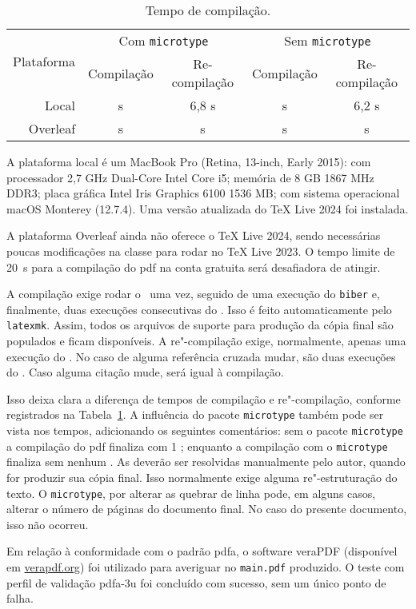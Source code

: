 \begin{table}
	\caption{Tempo de compilação.}
	\label{tab:time}
	\begin{tabular}{r c c c c}\toprule
		\multirow{2}{*}{Plataforma}	&	\multicolumn{2}{c}{Com \texttt{microtype}}	&	\multicolumn{2}{c}{Sem \texttt{microtype}}\\
								&	Compilação	& Re-compilação	& Compilação	& Re-compilação\\\midrule
		Local	&	s	&	6,8 s	&	s	&	6,2 s\\
		Overleaf	&	s	&	s	&	s	&	s\\\bottomrule
	\end{tabular}
\end{table}

A plataforma local é um MacBook Pro (Retina, 13-inch, Early 2015): com processador 2,7 GHz Dual-Core Intel Core i5; memória de 8 GB 1867 MHz DDR3; placa gráfica Intel Iris Graphics 6100 1536 MB; com sistema operacional macOS Monterey (12.7.4). Uma versão atualizada do TeX Live 2024 foi instalada.

A plataforma Overleaf ainda não oferece o TeX Live 2024, sendo necessárias poucas modificações na classe para rodar no TeX Live 2023. O tempo limite de 20~s para a compilação do \ac{pdf} na conta gratuita será desafiadora de atingir.

A compilação exige rodar o \pdflatex\ uma vez, seguido de uma execução do \texttt{biber} e, finalmente, duas execuções consecutivas do \pdflatex. Isso é feito automaticamente pelo \texttt{latexmk}. Assim, todos os arquivos de suporte para produção da cópia final são populados e ficam disponíveis. A re"-compilação exige, normalmente, apenas uma execução do \pdflatex. No caso de alguma referência cruzada mudar, são duas execuções do \pdflatex. Caso alguma citação mude, será igual à compilação.

Isso deixa clara a diferença de tempos de compilação e re"-compilação, conforme registrados na Tabela~\ref{tab:time}. A influência do pacote \texttt{microtype} também pode ser vista nos tempos, adicionando os seguintes comentários: sem o pacote \texttt{microtype} a compilação do \ac{pdf} finaliza com 1 ; enquanto a compilação com o \texttt{microtype} finaliza sem nenhum . As  deverão ser resolvidas manualmente pelo autor, quando for produzir sua cópia final. Isso normalmente exige alguma re"-estruturação do texto. O \texttt{microtype}, por alterar as quebrar de linha pode, em alguns casos, alterar o número de páginas do documento final. No caso do presente documento, isso não ocorreu.

Em relação à conformidade com o padrão \ac{pdfa}, o software veraPDF (disponível em \url{verapdf.org}) foi utilizado para averiguar no \texttt{main.pdf} produzido. O teste com perfil de validação \ac{pdfa}-3u foi concluído com sucesso, sem um único ponto de falha.
